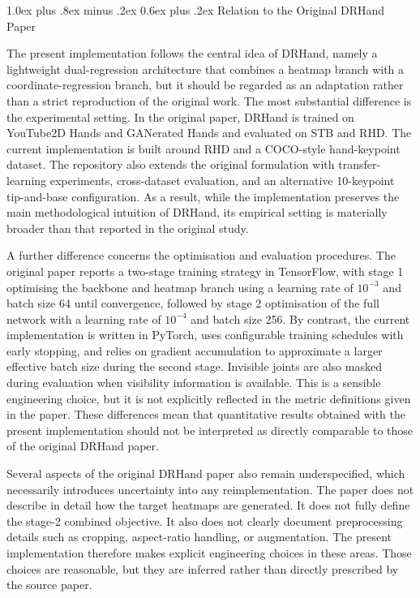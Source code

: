 \documentclass[10pt,letterpaper,twocolumn]{article}
\makeatletter
\renewcommand\subsection{\@startsection{subsection}{2}{\z@}%
  {1.0ex plus .8ex minus .2ex}%
  {0.6ex plus .2ex}%
  {\normalfont\itshape}}
\makeatother
\begin{document}
\subsection{Relation to the Original DRHand Paper}

The present implementation follows the central idea of DRHand, namely a lightweight dual-regression architecture that combines a heatmap branch with a coordinate-regression branch, but it should be regarded as an adaptation rather than a strict reproduction of the original work. The most substantial difference is the experimental setting. In the original paper, DRHand is trained on YouTube2D Hands and GANerated Hands and evaluated on STB and RHD. The current implementation is built around RHD and a COCO-style hand-keypoint dataset. The repository also extends the original formulation with transfer-learning experiments, cross-dataset evaluation, and an alternative 10-keypoint tip-and-base configuration. As a result, while the implementation preserves the main methodological intuition of DRHand, its empirical setting is materially broader than that reported in the original study.

A further difference concerns the optimisation and evaluation procedures. The original paper reports a two-stage training strategy in TensorFlow, with stage 1 optimising the backbone and heatmap branch using a learning rate of $10^{-3}$ and batch size 64 until convergence, followed by stage 2 optimisation of the full network with a learning rate of $10^{-4}$ and batch size 256. By contrast, the current implementation is written in PyTorch, uses configurable training schedules with early stopping, and relies on gradient accumulation to approximate a larger effective batch size during the second stage. Invisible joints are also masked during evaluation when visibility information is available. This is a sensible engineering choice, but it is not explicitly reflected in the metric definitions given in the paper. These differences mean that quantitative results obtained with the present implementation should not be interpreted as directly comparable to those of the original DRHand paper.

Several aspects of the original DRHand paper also remain underspecified, which necessarily introduces uncertainty into any reimplementation. The paper does not describe in detail how the target heatmaps are generated. It does not fully define the stage-2 combined objective. It also does not clearly document preprocessing details such as cropping, aspect-ratio handling, or augmentation. The present implementation therefore makes explicit engineering choices in these areas. Those choices are reasonable, but they are inferred rather than directly prescribed by the source paper.
\end{document}
